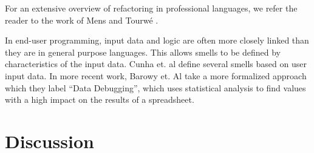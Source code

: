 \documentclass[10pt,conference,compsocconf]{IEEEtran}
\begin{document}
For an extensive overview of refactoring in professional languages, we refer the reader to the work of Mens and Tourw\'{e} \cite{mens2004survey}.

In end-user programming, input data and logic are often more closely linked than they are in general purpose languages.
This allows smells to be defined by characteristics of the input data.
Cunha et. al \cite{cunha2012towards} define several smells based on user input data.
In more recent work, Barowy et. Al \cite{barowy2014checkcell} take a  more formalized approach which they label ``Data Debugging'', which uses statistical analysis to find values with a high impact on the results of a spreadsheet.

%
%
%

\section{Discussion}
\label{sec:discussion}
\end{document}
